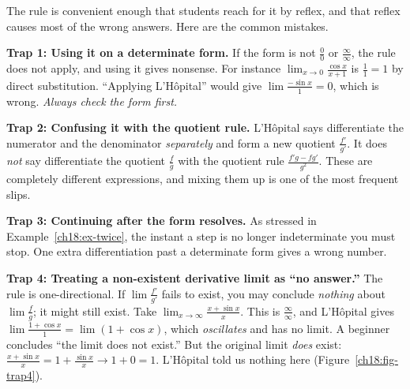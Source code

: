 The rule is convenient enough that students reach for it by reflex, and that reflex
causes most of the wrong answers. Here are the common mistakes.

\begin{trapbox}
\textbf{Trap 1: Using it on a determinate form.} If the form is not $\tfrac00$ or
$\tfrac{\infty}{\infty}$, the rule does not apply, and using it gives nonsense.
For instance $\displaystyle\lim_{x\to 0}\frac{\cos x}{x+1}$ is $\tfrac{1}{1}=1$ by
direct substitution. ``Applying L'H\^opital'' would give
$\lim \tfrac{-\sin x}{1}=0$, which is wrong. \emph{Always check the form first.}
\end{trapbox}

\begin{trapbox}
\textbf{Trap 2: Confusing it with the quotient rule.} L'H\^opital says differentiate the
numerator and the denominator \emph{separately} and form a new quotient
$\tfrac{f'}{g'}$. It does \emph{not} say differentiate the quotient $\tfrac{f}{g}$ with
the quotient rule $\tfrac{f'g-fg'}{g^2}$. These are completely different expressions,
and mixing them up is one of the most frequent slips.
\end{trapbox}

\begin{trapbox}
\textbf{Trap 3: Continuing after the form resolves.} As stressed in
Example~\ref{ch18:ex-twice}, the instant a step is no longer indeterminate you must
stop. One extra differentiation past a determinate form gives a wrong number.
\end{trapbox}

\begin{trapbox}
\textbf{Trap 4: Treating a non-existent derivative limit as ``no answer.''} The rule is
one-directional. If $\lim\tfrac{f'}{g'}$ fails to exist, you may conclude
\emph{nothing} about $\lim\tfrac{f}{g}$; it might still exist. Take
$\displaystyle\lim_{x\to\infty}\frac{x+\sin x}{x}$. This is $\tfrac{\infty}{\infty}$,
and L'H\^opital gives $\lim \tfrac{1+\cos x}{1}=\lim(1+\cos x)$, which \emph{oscillates}
and has no limit. A beginner concludes ``the limit does not exist.'' But the original
limit \emph{does} exist: $\frac{x+\sin x}{x}=1+\frac{\sin x}{x}\to 1+0=1$.
L'H\^opital told us nothing here (Figure~\ref{ch18:fig-trap4}).
\end{trapbox}

